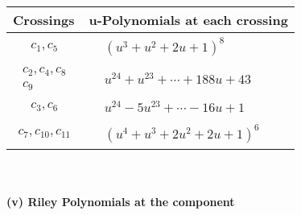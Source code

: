\documentclass[1p]{elsarticle_modified}
\theoremstyle{definition}
\begin{document}
\begin{tabular}{m{50pt}|m{274pt}}
Crossings & \hspace{64pt}u-Polynomials at each crossing \\
\hline $$\begin{aligned}c_{1},c_{5}\end{aligned}$$&$\begin{aligned}
&(u^3+u^2+2 u+1)^8
\end{aligned}$\\
\hline $$\begin{aligned}c_{2},c_{4},c_{8}\\c_{9}\end{aligned}$$&$\begin{aligned}
&u^{24}+u^{23}+\cdots+188 u+43
\end{aligned}$\\
\hline $$\begin{aligned}c_{3},c_{6}\end{aligned}$$&$\begin{aligned}
&u^{24}-5 u^{23}+\cdots-16 u+1
\end{aligned}$\\
\hline $$\begin{aligned}c_{7},c_{10},c_{11}\end{aligned}$$&$\begin{aligned}
&(u^4+u^3+2 u^2+2 u+1)^6
\end{aligned}$\\
\hline
\end{tabular}\\~\\
\newpage\renewcommand{\arraystretch}{1}
\flushleft \textbf{(v) Riley Polynomials at the component}\newline \\
\end{document}
